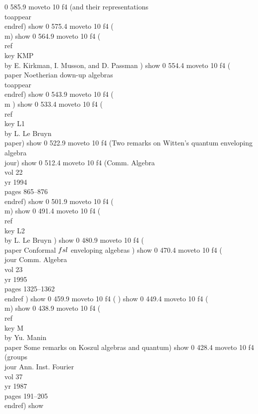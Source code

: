 0 585.9 moveto
10 f4
(and their representations \\toappear \\endref) show
0 575.4 moveto
10 f4
(\\m) show
0 564.9 moveto
10 f4
(\\ref \\key KMP \\by E. Kirkman, I. Musson, and D. Passman  ) show
0 554.4 moveto
10 f4
(\\paper Noetherian down-up algebras \\toappear \\endref) show
0 543.9 moveto
10 f4
(\\m ) show
0 533.4 moveto
10 f4
(\\ref \\key L1 \\by L. Le Bruyn \\paper) show
0 522.9 moveto
10 f4
(Two remarks on Witten's quantum enveloping algebra \\jour) show
0 512.4 moveto
10 f4
(Comm. Algebra \\vol 22 \\yr 1994 \\pages 865--876 \\endref) show
0 501.9 moveto
10 f4
(\\m) show
0 491.4 moveto
10 f4
(\\ref \\key L2 \\by L. Le Bruyn ) show
0 480.9 moveto
10 f4
(\\paper Conformal $\\fsl$ enveloping algebras ) show
0 470.4 moveto
10 f4
(\\jour Comm. Algebra \\vol 23 \\yr 1995 \\pages 1325--1362 \\endref ) show
0 459.9 moveto
10 f4
( ) show
0 449.4 moveto
10 f4
(\\m) show
0 438.9 moveto
10 f4
(\\ref \\key M \\by Yu. Manin \\paper Some remarks on Koszul algebras and quantum) show
0 428.4 moveto
10 f4
(groups \\jour Ann. Inst. Fourier \\vol 37 \\yr 1987 \\pages 191--205 \\endref) show
